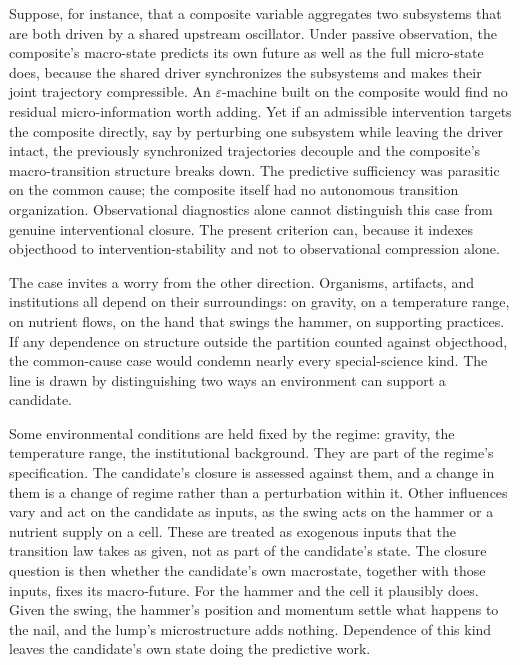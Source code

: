 Suppose, for instance, that a composite variable aggregates
two subsystems that are both driven by a shared upstream oscillator. Under
passive observation, the composite's macro-state predicts its own future
as well as the full micro-state does, because the shared driver
synchronizes the subsystems and makes their joint trajectory
compressible. An \(\varepsilon\)-machine built on the composite would
find no residual micro-information worth adding. Yet if an admissible
intervention targets the composite directly, say by perturbing one
subsystem while leaving the driver intact, the previously synchronized
trajectories decouple and the composite's macro-transition structure
breaks down. The predictive sufficiency was parasitic on the common
cause; the composite itself had no autonomous transition organization.
Observational diagnostics alone cannot distinguish this case from genuine interventional closure. The present criterion can, because it indexes objecthood to
intervention-stability and not to observational compression alone.

The case invites a worry from the other direction. Organisms,
artifacts, and institutions all depend on their surroundings: on
gravity, on a temperature range, on nutrient flows, on the hand that
swings the hammer, on supporting practices. If any dependence on
structure outside the partition counted against objecthood, the
common-cause case would condemn nearly every special-science kind. The
line is drawn by distinguishing two ways an environment can support a
candidate.

Some environmental conditions are held fixed by the regime: gravity,
the temperature range, the institutional background. They are part of
the regime's specification. The candidate's closure is assessed against
them, and a change in them is a change of regime rather than a
perturbation within it. Other influences vary and act on the candidate
as inputs, as the swing acts on the hammer or a nutrient supply on a
cell. These are treated as exogenous inputs that the transition law
takes as given, not as part of the candidate's state. The closure
question is then whether the candidate's own macrostate, together with
those inputs, fixes its macro-future. For the hammer and the cell it
plausibly does. Given the swing, the hammer's position and momentum
settle what happens to the nail, and the lump's microstructure adds
nothing. Dependence of this kind leaves the candidate's own state doing
the predictive work.

